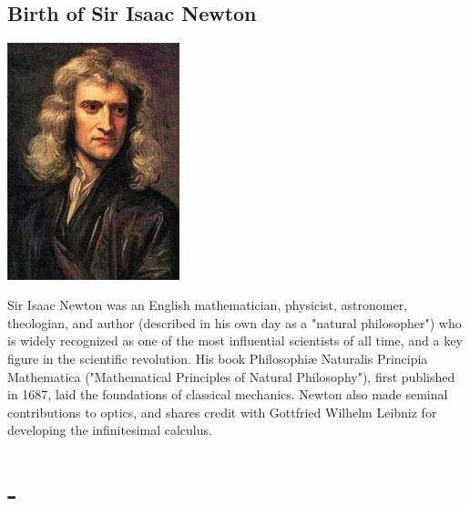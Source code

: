 \documentclass[11pt]{report}
\begin{document}
\subsection{Birth of Sir Isaac Newton}
\vspace{2mm}\begin{center}\includegraphics[width=5cm]{./img/isaacNewton.jpg}\end{center}
Sir Isaac Newton was an English mathematician, physicist, astronomer, theologian, and author (described in his own day as a "natural philosopher") who is widely recognized as one of the most influential scientists of all time, and a key figure in the scientific revolution. His book Philosophiæ Naturalis Principia Mathematica ("Mathematical Principles of Natural Philosophy"), first published in 1687, laid the foundations of classical mechanics. Newton also made seminal contributions to optics, and shares credit with Gottfried Wilhelm Leibniz for developing the infinitesimal calculus.
\section{-}
\end{document}

